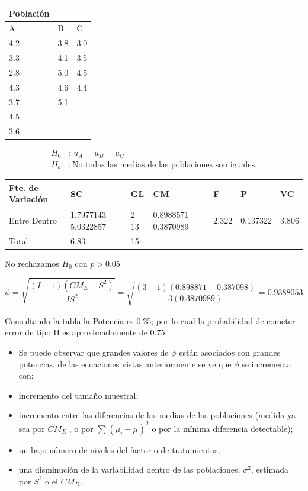 \documentclass[]{book}
\theoremstyle{definition}
\theoremstyle{definition}
\theoremstyle{definition}
\theoremstyle{remark}
\begin{document}
\begin{longtable}[]{@{}lll@{}}
\toprule
Población & &\tabularnewline
\midrule
\endhead
A & B & C\tabularnewline
4.2 & 3.8 & 3.0\tabularnewline
3.3 & 4.1 & 3.5\tabularnewline
2.8 & 5.0 & 4.5\tabularnewline
4.3 & 4.6 & 4.4\tabularnewline
3.7 & 5.1 &\tabularnewline
4.5 & &\tabularnewline
3.6 & &\tabularnewline
\bottomrule
\end{longtable}

\[
\begin{aligned}
H_{0}&:\ u_{A} = u_{B} = u_{C}\\
H_{a}&:\ \text{No todas las medias de las poblaciones son iguales.}
\end{aligned}
\]

\begin{longtable}[]{@{}lllllll@{}}
\toprule
Fte. de Variación & SC & GL & CM & F & P & VC\tabularnewline
\midrule
\endhead
Entre Dentro & 1.7977143 5.0322857 & 2 13 & 0.8988571 0.3870989 & 2.322
& 0.137322 & 3.806\tabularnewline
Total & 6.83 & 15 & & & &\tabularnewline
\bottomrule
\end{longtable}

No rechazamos \(H_{0}\) con \(p > 0.05\)

\[
\phi = \sqrt{\frac{\left( I - 1 \right)\left( CM_E - S^{2} \right)}{IS^{2}}} = \sqrt{\frac{\left( 3 - 1 \right)\left( 0.898871 - 0.387098 \right)}{3\left( 0.3870989 \right)}} = 0.9388053
\]

Consultando la tabla la Potencia es 0.25; por lo cual la probabilidad de
cometer error de tipo II es aproximadamente de 0.75.

\begin{itemize}
\item
  Se puede observar que grandes valores de \(\phi\) están asociados con
  grandes potencias, de las ecuaciones vistas anteriormente se ve que
  \(\phi\) se incrementa con:
\item
  incremento del tamaño muestral;
\item
  incremento entre las diferencias de las medias de las poblaciones
  (medida ya sea por \(CM_E\) , o por
  \(\sum_{}^{}\left( \mu_{i} - \mu_{} \right)^{2}\) o por la mínima
  diferencia detectable);
\item
  un bajo número de niveles del factor o de tratamientos;
\item
  una disminución de la variabilidad dentro de las poblaciones,
  \(\sigma^{2}\), estimada por \(S^{2}\) o el \(CM_D\).
\end{itemize}
\end{document}
